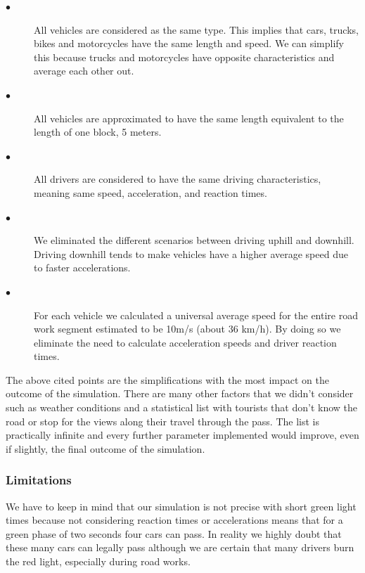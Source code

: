 \documentclass[11pt,a4paper,parskip=half-]{article}
\begin{document}
\begin{description}
  
  \item[$\bullet$ ] All vehicles are considered as the same type. This implies that cars, trucks, bikes and motorcycles have the same length and speed. We can simplify this because trucks and motorcycles have opposite characteristics and average each other out. 
  
  \item[$\bullet$ ] All vehicles are approximated to have the same length equivalent to the length of one block, 5 meters. 
  
  \item[$\bullet$ ] All drivers are considered to have the same driving characteristics, meaning same speed, acceleration, and reaction times.
  
  \item[$\bullet$ ] We eliminated the different scenarios between driving uphill and downhill. Driving downhill tends to make vehicles have a higher average speed due to faster accelerations. 
  
  \item[$\bullet$ ] For each vehicle we calculated a universal average speed for the entire road work segment estimated to be 10m/s (about 36 km/h). By doing so we eliminate the need to calculate acceleration speeds and driver reaction times. 
  
 \end{description}
 
 
 The above cited points are the simplifications with the most impact on the outcome of the simulation. There are many other factors that we didn't consider such as weather conditions and a statistical list with tourists that don't know the road or stop for the views along their travel through the pass. The list is practically infinite and every further parameter implemented would improve, even if slightly, the final outcome of the simulation. 
  
   
  \subsubsection{Limitations}
  We have to keep in mind that our simulation is not precise with short green light times because not considering reaction times or accelerations means that for a green phase of two seconds four cars can pass. In reality we highly doubt that these many cars can legally pass although we are certain that many drivers burn the red light, especially during road works. 
   
\end{document}
